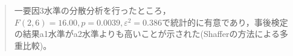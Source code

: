 \begin{quote}
	一要因3水準の分散分析を行ったところ，$F(2,6)=16.00,p=0.0039,\varepsilon^2=0.386$で統計的に有意であり，事後検定の結果a1水準がa2水準よりも高いことが示された(Shafferの方法による多重比較)。
\end{quote}
